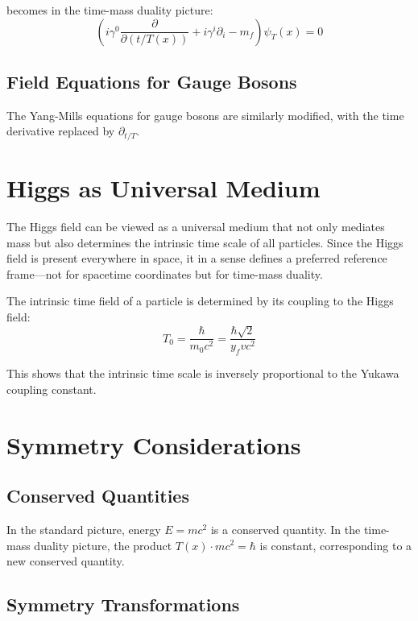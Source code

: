 \documentclass[a4paper,12pt]{article}
\newcommand{\Tfield}{T(x)} %
\begin{document}
	becomes in the time-mass duality picture:
	\begin{equation}
		\left(i\gamma^0\frac{\partial}{\partial(t/\Tfield)} + i\gamma^i\partial_i - m_f\right) \psi_T(x) = 0
	\end{equation}
	
	\subsection{Field Equations for Gauge Bosons}
	
	The Yang-Mills equations for gauge bosons are similarly modified, with the time derivative replaced by $\partial_{t/T}$.
	
	\section{Higgs as Universal Medium}
	
	The Higgs field can be viewed as a universal medium that not only mediates mass but also determines the intrinsic time scale of all particles. Since the Higgs field is present everywhere in space, it in a sense defines a preferred reference frame—not for spacetime coordinates but for time-mass duality.
	
	The intrinsic time field of a particle is determined by its coupling to the Higgs field:
	\begin{equation}
		T_0 = \frac{\hbar}{m_0 c^2} = \frac{\hbar \sqrt{2}}{y_f v c^2}
	\end{equation}
	
	This shows that the intrinsic time scale is inversely proportional to the Yukawa coupling constant.
	
	\section{Symmetry Considerations}
	
	\subsection{Conserved Quantities}
	
	In the standard picture, energy $E = mc^2$ is a conserved quantity. In the time-mass duality picture, the product $\Tfield \cdot m c^2 = \hbar$ is constant, corresponding to a new conserved quantity.
	
	\subsection{Symmetry Transformations}
	
\end{document}
